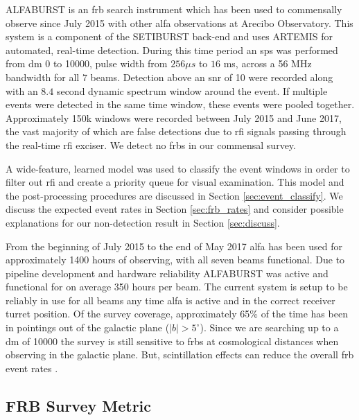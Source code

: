 \documentclass[a4paper,fleqn,usenatbib]{mnras}
\begin{document}
ALFABURST is an \gls*{frb} search instrument which has been used to commensally
observe since July 2015 with other \gls*{alfa} observations at Arecibo
Observatory. This system is a component of the SETIBURST back-end
\citep{2017ApJS..228...21C} and uses ARTEMIS \citep{2015MNRAS.452.1254K} for
automated, real-time detection. During this time period an \gls*{sps} was
performed from \gls*{dm} 0 to 10000, pulse width from $256 \mu s$ to $16$ ms,
across a 56 MHz bandwidth for all 7 beams. Detection above an \gls*{snr} of 10
were recorded along with an $8.4$ second dynamic spectrum window around the
event. If multiple events were detected in the same time window, these events
were pooled together.  Approximately 150k windows were recorded between July
2015 and June 2017, the vast majority of which are false detections due to
\gls*{rfi} signals passing through the real-time \gls*{rfi} exciser. We detect
no \glspl*{frb} in our commensal survey.

A wide-feature, learned model was used to classify the event windows in order to
filter out \gls*{rfi} and create a priority queue for visual examination. This
model and the post-processing procedures are discussed in Section
\ref{sec:event_classify}. We discuss the expected event rates in Section
\ref{sec:frb_rates} and consider possible explanations for our non-detection
result in Section \ref{sec:discuss}.


From the beginning of July 2015 to the end of May 2017 \gls*{alfa} has been
used for approximately 1400 hours of observing, with all seven beams
functional. Due to pipeline development and hardware reliability ALFABURST was
active and functional for on average 350 hours per beam.  The current system is
setup to be reliably in use for all beams any time \gls*{alfa} is active and in
the correct receiver turret position. Of the survey coverage, approximately
65\% of the time has been in pointings out of the galactic plane ($|b| >
5^{\circ}$). Since we are searching up to a \gls{dm} of 10000 the survey is
still sensitive to \glspl{frb} at cosmological distances when observing in the
galactic plane. But, scintillation effects can reduce the overall \gls{frb}
event rates \citep{2015MNRAS.451.3278M}.


\subsection{FRB Survey Metric}
\label{sec:survey_metric}
\end{document}
